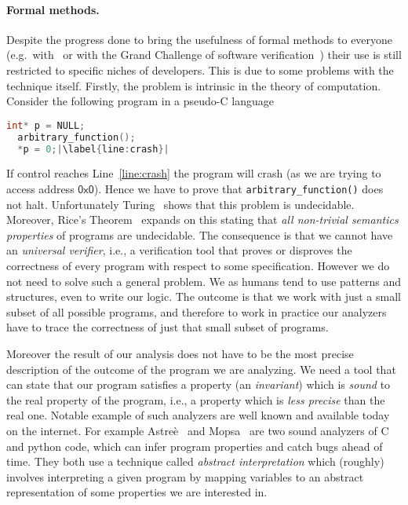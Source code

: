 \paragraph*{Formal methods.} Despite the progress done to bring the
usefulness of formal methods to everyone (e.g.\
with~\cite{10.1145/3371078, 10.1145/3338112} or with the Grand
Challenge of software verification~\cite{1621009,Hoare2008,1707636})
their use is still restricted to specific niches of developers. This
is due to some problems with the technique itself. Firstly, the problem
is intrinsic in the theory of computation. Consider the following
program in a pseudo-C language

\begin{lstlisting}[language=C,escapechar=|,]
  int* p = NULL;
  arbitrary_function();
  *p = 0;|\label{line:crash}|
\end{lstlisting}

If control reaches Line~\ref{line:crash} the program will crash (as we
are trying to access address \(\mathsf{0x0}\)). Hence we have to
prove that \texttt{arbitrary\_function()} does not halt. Unfortunately
Turing~\cite{10.7551/mitpress/12274.003.0008} shows that this problem
is undecidable. Moreover, Rice's Theorem~\cite{rice1953classes}
expands on this stating that \emph{all non-trivial semantics
  properties} of programs are undecidable. The consequence is that we
cannot have an \emph{universal verifier}, i.e., a verification tool
that proves or disproves the correctness of every program with respect
to some specification. However we do not need to solve such a general
problem. We as humans tend to use patterns and structures, even to
write our logic. The outcome is that we work with just a small subset
of all possible programs, and therefore to work in practice our
analyzers have to trace the correctness of just that small subset of
programs.

\medskip

Moreover the result of our analysis does not have to be the most
precise description of the outcome of the program we are analyzing. We
need a tool that can state that our program satisfies a property (an
\emph{invariant}) which is \emph{sound} to the real property of the
program, i.e., a property which is \emph{less precise} than the real
one. Notable example of such analyzers are well known and available
today on the internet. For example
Astreè~\cite{10.1007/978-3-540-31987-0_3} and
Mopsa~\cite{10.1007/978-3-031-30820-8_37} are two sound analyzers of C
and python code, which can infer program properties and catch bugs
ahead of time. They both use a technique called \emph{abstract
  interpretation} which (roughly) involves interpreting a given
program by mapping variables to an abstract representation of some
properties we are interested in.

